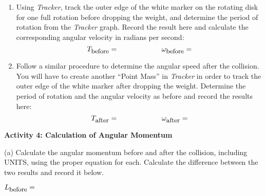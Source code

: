 \begin{enumerate}
\item Using \textit{Tracker}, track the outer edge of the white marker on the rotating disk 
for one full rotation before dropping the weight, and determine the period of rotation from the 
\textit{Tracker} graph. Record the result here and calculate the corresponding angular velocity 
in radians per second:
\[
T_{\mbox{\small before}}=\qquad \qquad \qquad \omega _{\mbox{\small before}}=\]
\vspace{5mm}
\item Follow a similar procedure to determine the angular speed after the collision. You will have 
to create another ``Point Mass'' in \textit{Tracker} in order to track the outer edge of the white 
marker after dropping the weight. Determine the period of rotation and the angular velocity as 
before and record the results here:
\[
T_{\mbox{\small after}}=\qquad \qquad \qquad \omega _{\mbox{\small after}}=\]

\end{enumerate}
\answerspace{10mm}
\pagebreak[2]
\textbf{Activity 4: Calculation of Angular Momentum}

(a) Calculate the angular momentum before and after the collision, including UNITS, using the proper equation for each. Calculate the difference between the two results and record it below. 
\vspace{5mm}

\( L_{\mbox{\small before}}= \)  
\vspace{5mm}

